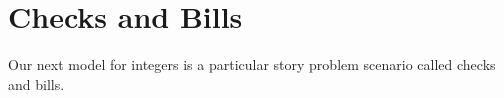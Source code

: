 \documentclass{ximera}
\begin{document}
%
%
%


\section{Checks and Bills}

Our next model for integers is a particular story problem scenario called checks and bills. 
\end{document}
